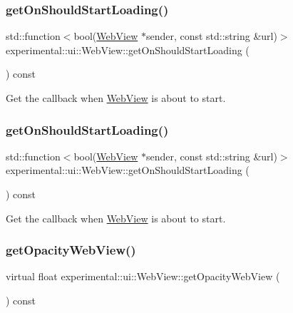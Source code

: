 \subsubsection{\texorpdfstring{get\+On\+Should\+Start\+Loading()}{getOnShouldStartLoading()}\hspace{0.1cm}{\footnotesize\ttfamily [1/2]}}
{\footnotesize\ttfamily std\+::function$<$bool(\hyperlink{classexperimental_1_1ui_1_1WebView}{Web\+View} $\ast$sender, const std\+::string \&url)$>$ experimental\+::ui\+::\+Web\+View\+::get\+On\+Should\+Start\+Loading (\begin{DoxyParamCaption}{ }\end{DoxyParamCaption}) const}

Get the callback when \hyperlink{classexperimental_1_1ui_1_1WebView}{Web\+View} is about to start. \mbox{\label{classexperimental_1_1ui_1_1WebView_ad8bf0cc832c0d88fcb1317563c14242f}} 
\subsubsection{\texorpdfstring{get\+On\+Should\+Start\+Loading()}{getOnShouldStartLoading()}\hspace{0.1cm}{\footnotesize\ttfamily [2/2]}}
{\footnotesize\ttfamily std\+::function$<$bool(\hyperlink{classexperimental_1_1ui_1_1WebView}{Web\+View} $\ast$sender, const std\+::string \&url)$>$ experimental\+::ui\+::\+Web\+View\+::get\+On\+Should\+Start\+Loading (\begin{DoxyParamCaption}{ }\end{DoxyParamCaption}) const}

Get the callback when \hyperlink{classexperimental_1_1ui_1_1WebView}{Web\+View} is about to start. \mbox{\label{classexperimental_1_1ui_1_1WebView_a131ed65ceec3a88dfb9630abfbde7d84}} 
\subsubsection{\texorpdfstring{get\+Opacity\+Web\+View()}{getOpacityWebView()}}
{\footnotesize\ttfamily virtual float experimental\+::ui\+::\+Web\+View\+::get\+Opacity\+Web\+View (\begin{DoxyParamCaption}{ }\end{DoxyParamCaption}) const\hspace{0.3cm}{\ttfamily [virtual]}}

